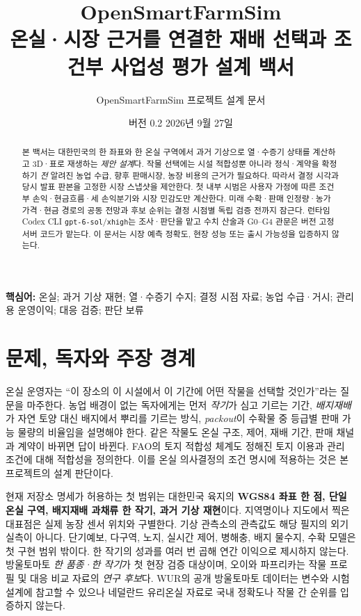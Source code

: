 \documentclass[11pt,a4paper]{article}
\title{\textbf{OpenSmartFarmSim}\\[0.35em]\large 온실·시장 근거를 연결한 재배 선택과 조건부 사업성 평가 설계 백서}
\author{OpenSmartFarmSim 프로젝트 설계 문서}
\date{버전 0.2 \quad 2026년 9월 27일\\[0.3em]\status}
\begin{document}
\maketitle
\begin{abstract}
본 백서는 대한민국의 한 좌표와 한 온실 구역에서 과거 기상으로 열·수증기 상태를 계산하고 3D·표로 재생하는 \emph{제안 설계}다. 작물 선택에는 시설 적합성뿐 아니라 정식·계약을 확정하기 \emph{전} 알려진 농업 수급, 향후 판매시장, 농장 비용의 근거가 필요하다. 따라서 결정 시각과 당시 발표 판본을 고정한 시장 스냅샷을 제안한다. 첫 내부 시범은 사용자 가정에 따른 조건부 손익·현금흐름·세 손익분기와 시장 민감도만 계산한다. 미래 수확·판매 인정량·농가 가격·현금 경로의 공동 전망과 후보 순위는 결정 시점별 독립 검증 전까지 잠근다. 런타임 Codex CLI \texttt{gpt-6-sol}/\texttt{xhigh}는 조사·판단을 맡고 수치 산술과 G0--G4 관문은 버전 고정 서버 코드가 맡는다. 이 문서는 시장 예측 정확도, 현장 성능 또는 출시 가능성을 입증하지 않는다.
\end{abstract}
\noindent\textbf{핵심어:} 온실; 과거 기상 재현; 열·수증기 수지; 결정 시점 자료; 농업 수급·거시; 관리용 운영이익; 대응 검증; 판단 보류

\tableofcontents
\clearpage

\section{문제, 독자와 주장 경계}
온실 운영자는 ``이 장소의 이 시설에서 이 기간에 어떤 작물을 선택할 것인가''라는 질문을 마주한다. 농업 배경이 없는 독자에게는 먼저 \emph{작기}가 심고 기르는 기간, \emph{배지재배}가 자연 토양 대신 배지에서 뿌리를 기르는 방식, \emph{packout}이 수확물 중 등급별 판매 가능 물량의 비율임을 설명해야 한다. 같은 작물도 온실 구조, 제어, 재배 기간, 판매 채널과 계약이 바뀌면 답이 바뀐다. FAO의 토지 적합성 체계도 정해진 토지 이용과 관리 조건에 대해 적합성을 정의한다. 이를 온실 의사결정의 조건 명시에 적용하는 것은 본 프로젝트의 설계 판단이다\cite{fao-land}.

현재 저장소 명세가 허용하는 첫 범위는 대한민국 육지의 \textbf{WGS84 좌표 한 점, 단일 온실 구역, 배지재배 과채류 한 작기, 과거 기상 재현}이다. 지역명이나 지도에서 찍은 대표점은 실제 농장 센서 위치와 구별한다. 기상 관측소의 관측값도 해당 필지의 외기 실측이 아니다. 단기예보, 다구역, 노지, 실시간 제어, 병해충, 배지 물수지, 수확 모델은 첫 구현 범위 밖이다. 한 작기의 성과를 여러 번 곱해 연간 이익으로 제시하지 않는다. 방울토마토 \emph{한 품종·한 작기}가 첫 현장 검증 대상이며, 오이와 파프리카는 작물 프로필 및 대응 비교 자료의 \emph{연구 후보}다. WUR의 공개 방울토마토 데이터는 변수와 시험 설계에 참고할 수 있으나 네덜란드 유리온실 자료로 국내 정확도나 작물 간 순위를 입증하지 않는다\cite{wur-data}.
\end{document}
